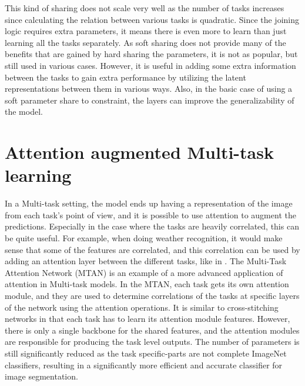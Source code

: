 This kind of sharing does not scale very well as the number of tasks increases since calculating the relation between various tasks is quadratic.
Since the joining logic requires extra parameters, it means there is even more to learn than just learning all the tasks separately.
As soft sharing does not provide many of the benefits that are gained by hard sharing the parameters, it is not as popular, but still used in various cases.
However, it is useful in adding some extra information between the tasks to gain extra performance by utilizing the latent representations between them in various ways.
Also, in the basic case of using a soft parameter share to constraint, the layers can improve the generalizability of the model.

\section{Attention augmented Multi-task learning}
In a Multi-task setting, the model ends up having a representation of the image from each task's point of view, and it is possible to use attention \citep{attention} to augment the predictions.
Especially in the case where the tasks are heavily correlated, this can be quite useful.
For example, when doing weather recognition, it would make sense that some of the features are correlated, and this correlation can be used by adding an attention layer between the different tasks, like in \citep{cnn-rnn}.
The Multi-Task Attention Network (MTAN) \citep{multiTaskAttention} is an example of a more advanced application of attention in Multi-task models.
In the MTAN, each task gets its own attention module, and they are used to determine correlations of the tasks at specific layers of the network using the attention operations.
It is similar to cross-stitching networks in that each task has to learn its attention module features.
However, there is only a single backbone for the shared features, and the attention modules are responsible for producing the task level outputs.
The number of parameters is still significantly reduced as the task specific-parts are not complete ImageNet classifiers, resulting in a significantly more efficient and accurate classifier for image segmentation.

